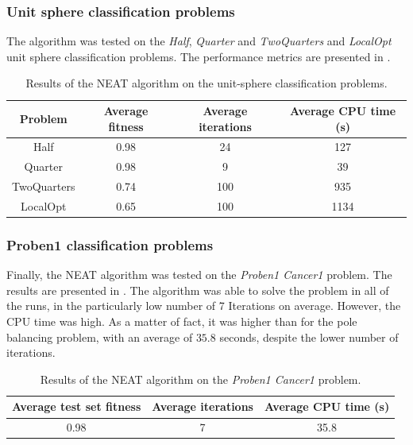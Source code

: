 \subsubsection{Unit sphere classification problems}

The algorithm was tested on the \textit{Half}, \textit{Quarter} and \textit{TwoQuarters} and \textit{LocalOpt} unit sphere classification problems. The performance metrics are presented in .


\begin{table}
    \caption{Results of the NEAT algorithm on the unit-sphere classification problems.}
    \centering
    \label{tab:nneat_sphere}
    \begin{tabular}{ |c|c|c|c| }
        \hline
        Problem & Average fitness & Average iterations & Average CPU time (s) \\
        \hline
        Half & 0.98 & 24 & 127 \\
        \hline
        Quarter & 0.98 & 9 & 39 \\
        \hline
        TwoQuarters & 0.74 & 100 & 935 \\
        \hline
        LocalOpt & 0.65 & 100 & 1134 \\
        \hline\hline
    \end{tabular}
\end{table}

\subsubsection{Proben1 classification problems}

Finally, the NEAT algorithm was tested on the \textit{Proben1 Cancer1} problem. The results are presented in .
The algorithm was able to solve the problem in all of the runs, in the particularly low number of 7 Iterations on average. However, the CPU time was high. As a matter of fact, it was
higher than for the pole balancing problem, with an average of $35.8$ seconds, despite the lower number of iterations.


\begin{table}
    \caption{Results of the NEAT algorithm on the \textit{Proben1 Cancer1} problem.}
    \centering
    \label{tab:neat_proben1}
    \begin{tabular}{ |c|c|c| }
        \hline
        Average test set fitness & Average iterations & Average CPU time (s) \\
        \hline
        0.98 & 7 & 35.8 \\
        \hline\hline
    \end{tabular}
\end{table}

